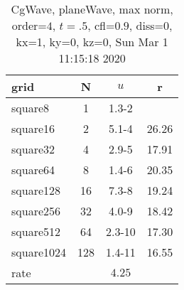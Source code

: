 \begin{table}[H]\tableFont %
\begin{center}
\begin{tabular}{|l|c|c|c|} \hline 
grid  & N &  $ u $ & r \\ \hline 
   square8 &     1 & \num{1.3}{-2} &       \\ \hline
  square16 &     2 & \num{5.1}{-4} & 26.26  \\ \hline
  square32 &     4 & \num{2.9}{-5} & 17.91  \\ \hline
  square64 &     8 & \num{1.4}{-6} & 20.35  \\ \hline
 square128 &    16 & \num{7.3}{-8} & 19.24  \\ \hline
 square256 &    32 & \num{4.0}{-9} & 18.42  \\ \hline
 square512 &    64 & \num{2.3}{-10} & 17.30  \\ \hline
square1024 &   128 & \num{1.4}{-11} & 16.55  \\ \hline
    rate             &       &  $4.25$       &       \\ \hline
\end{tabular}
\caption{CgWave, planeWave, max norm, order=$4$, $t=.5$, cfl=$0.9$, diss=$0$, kx=1, ky=0, kz=0, Sun Mar  1 11:15:18 2020}\label{table:planeWaveOrder4max}
\end{center}
\end{table}
